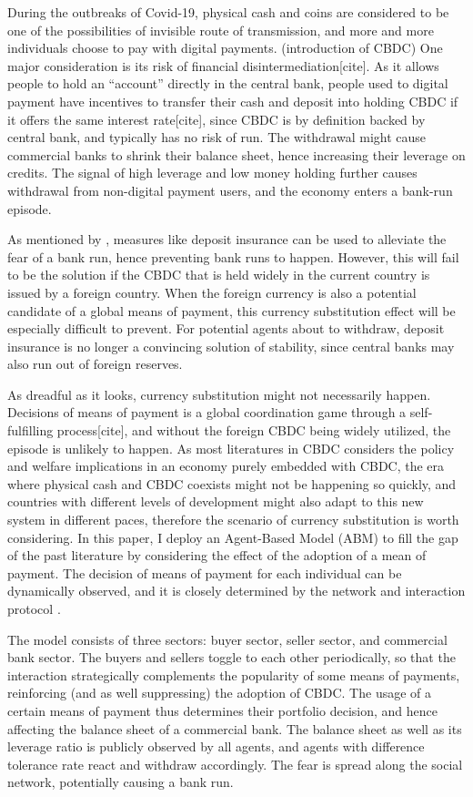 During the outbreaks of Covid-19, physical cash and coins are considered to be
one of the possibilities of invisible route of transmission, and more and more
individuals choose to pay with digital payments.
(introduction of CBDC)
One major consideration is its risk of financial disintermediation[cite].  As it
allows people to hold an ``account'' directly in the central bank, people used
to digital payment have incentives to transfer their cash and deposit into
holding CBDC if it offers the same interest rate[cite], since CBDC is by
definition backed by central bank, and typically has no risk of run. The
withdrawal might cause commercial banks to shrink their balance sheet, hence
increasing their leverage on credits.  The signal of high leverage and low money
holding further causes withdrawal from non-digital payment users, and the
economy enters a bank-run episode.

As mentioned by \citet*{DD83}, measures like deposit insurance can be used to
alleviate the fear of a bank run, hence preventing bank runs to happen. However,
this will fail to be the solution if the CBDC that is held widely in the current
country is issued by a foreign country. When the foreign currency is also a
potential candidate of a global means of payment, this currency substitution
effect will be especially difficult to prevent.
For potential agents about to withdraw, deposit insurance is no longer a
convincing solution of stability, since central banks may also run out of foreign reserves.

As dreadful as it looks, currency substitution might not necessarily happen.
Decisions of means of payment is a global coordination game through a
self-fulfilling process[cite], and without the foreign CBDC being widely
utilized, the episode is unlikely to happen.
As most literatures in CBDC considers the policy and welfare implications in an
economy purely embedded with CBDC, the era where physical cash and CBDC coexists
might not be happening so quickly, and countries with different levels of
development might also adapt to this new system in different paces, therefore the
scenario of currency substitution is worth considering.
In this paper, I deploy an Agent-Based Model (ABM) to fill the gap of the past
literature by considering the effect of the adoption of a mean of payment. The
decision of means of payment for each individual can be dynamically observed,
and it is closely determined by the network and interaction protocol \citep*{KW98}.

The model consists of three sectors: buyer sector, seller sector, and commercial
bank sector. The buyers and sellers toggle to each other periodically, so that
the interaction strategically complements the popularity of some means of
payments, reinforcing (and as well suppressing) the adoption of CBDC. The
usage of a certain means of payment thus determines their portfolio decision,
and hence affecting the balance sheet of a commercial bank. The balance sheet as
well as its leverage ratio is publicly observed by all agents, and agents with
difference tolerance rate react and withdraw accordingly. The fear is spread
along the social network, potentially causing a bank run.

